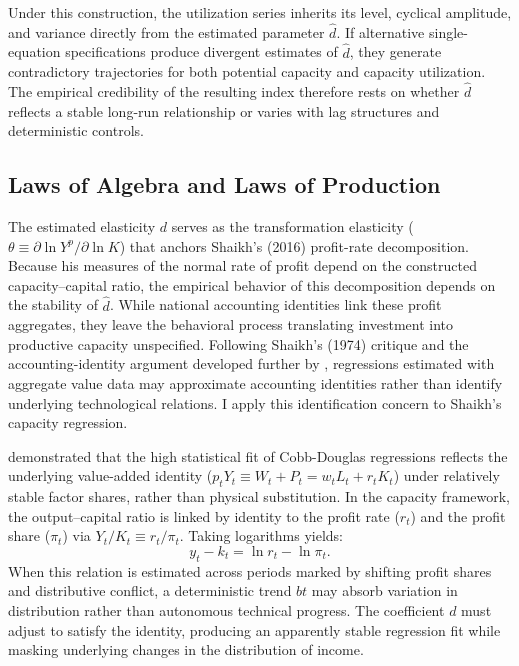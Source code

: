 Under this construction, the utilization series inherits its level, cyclical amplitude, and variance directly from the estimated parameter $\hat{d}$. If alternative single-equation specifications produce divergent estimates of $\hat{d}$, they generate contradictory trajectories for both potential capacity and capacity utilization. The empirical credibility of the resulting index therefore rests on whether $\hat{d}$ reflects a stable long-run relationship or varies with lag structures and deterministic controls.

\subsection{Laws of Algebra and Laws of Production}

The estimated elasticity $d$ serves as the transformation elasticity ($\theta \equiv \partial \ln Y^p / \partial \ln K$) that anchors Shaikh's (2016) profit-rate decomposition. Because his measures of the normal rate of profit depend on the constructed capacity--capital ratio, the empirical behavior of this decomposition depends on the stability of $\hat{d}$. While national accounting identities link these profit aggregates, they leave the behavioral process translating investment into productive capacity unspecified. Following Shaikh’s (1974) critique and the accounting-identity argument developed further by \citet{Felipe2005}, regressions estimated with aggregate value data may approximate accounting identities rather than identify underlying technological relations. I apply this identification concern to Shaikh’s capacity regression.

\citet{Shaikh1974} demonstrated that the high statistical fit of Cobb-Douglas regressions reflects the underlying value-added identity ($p_t Y_t \equiv W_t + P_t = w_t L_t + r_t K_t$) under relatively stable factor shares, rather than physical substitution. In the capacity framework, the output--capital ratio is linked by identity to the profit rate ($r_t$) and the profit share ($\pi_t$) via $Y_t / K_t \equiv r_t / \pi_t$. Taking logarithms yields:
\begin{equation}
y_t - k_t = \ln r_t - \ln \pi_t.
\end{equation}
When this relation is estimated across periods marked by shifting profit shares and distributive conflict, a deterministic trend $bt$ may absorb variation in distribution rather than autonomous technical progress. The coefficient $d$ must adjust to satisfy the identity, producing an apparently stable regression fit while masking underlying changes in the distribution of income.

